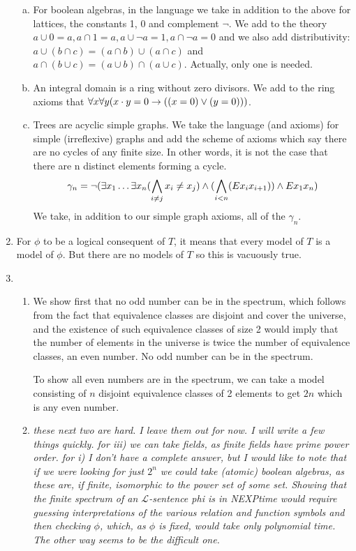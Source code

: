 \begin{enumerate}
\begin{enumerate}[a)]
	\item For boolean algebras, in the language we take in addition to the above for lattices, the constants 1, 0 and complement $\neg$. We add to the theory $a \cup 0 = a, a \cap 1 = a, a \cup \neg a = 1, a \cap \neg a = 0$ and we also add distributivity: $a \cup (b \cap c) = (a \cap b) \cup (a \cap c)$ and $a \cap (b \cup c) = (a \cup b) \cap (a \cup c)$. Actually, only one is needed. 
	
	\item An integral domain is a ring without zero divisors. We add to the ring axioms that $\forall x \forall y (x \cdot y = 0 \to ((x = 0) \lor (y = 0)))$. 
	
	\item Trees are acyclic simple graphs. We take the language (and axioms) for simple (irreflexive) graphs and add the scheme of axioms which say there are no cycles of any finite size. In other words, it is not the case that there are n distinct elements forming a cycle. \[\gamma_n = \neg (\exists x_1 \ldots \exists x_n (\bigwedge_{i \neq j} x_i \neq x_j)  \land (\bigwedge_{i < n} (Ex_ix_{i+1})) \land Ex_1x_n)\] We take, in addition to our simple graph axioms, all of the $\gamma_n$. 
	
	\end{enumerate}

\item For $\phi$ to be a logical consequent of $T$, it means that every model of $T$ is a model of $\phi$. But there are no models of $T$ so this is vacuously true. 

\item 

	 \begin{enumerate} 
	 
	  \item We show first that no odd number can be in the spectrum, which follows from the fact that equivalence classes are disjoint and cover the universe, and the existence of such equivalence classes of size 2 would imply that the number of elements in the universe is twice the number of equivalence classes, an even number. No odd number can be in the spectrum. 
	
	To show all even numbers are in the spectrum, we can take a model consisting of $n$ disjoint equivalence classes of 2 elements to get $2n$ which is any even number. 
	
	\item \emph{these next two are hard. I leave them out for now. I will write a few things quickly. for iii) we can take fields, as finite fields have prime power order. for i) I don't have a complete answer, but I would like to note that if we were looking for just $2^n$ we could take (atomic) boolean algebras, as these are, if finite, isomorphic to the power set of some set. Showing that the finite spectrum of an $\mathcal{L}$-sentence phi is in NEXPtime would require guessing interpretations of the various relation and function symbols and then checking $\phi$, which, as $\phi$ is fixed, would take only polynomial time. The other way seems to be the difficult one.}
	

\end{enumerate}
\end{enumerate}
